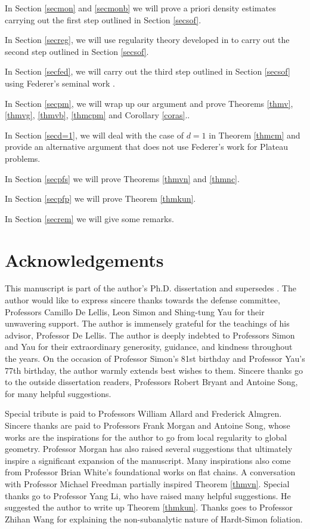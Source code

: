 \documentclass[11pt,a4paper]{amsart}
\numberwithin{equation}{section}
\theoremstyle{plain}
\theoremstyle{definition}
\numberwithin{equation}{subsection}
\begin{document}
In Section \ref{secmon} and \ref{secmonb} we will prove a priori density estimates carrying out the first step outlined in Section \ref{secsof}.

In Section \ref{secreg}, we will use regularity theory developed in \cite{DHMS} to carry out the second step outlined in Section \ref{secsof}.

In Section \ref{secfed}, we will carry out the third step outlined in Section \ref{secsof} using Federer's seminal work \cite{HFrf}.

In Section \ref{secpm}, we will wrap up our argument and prove  Theorems \ref{thmv}, \ref{thmvg}, \ref{thmvb}, \ref{thmcpm} and  Corollary \ref{coras}..

In Section \ref{secd=1}, we will deal with the case of $d=1$ in Theorem \ref{thmcm} and provide an alternative argument that does not use Federer's work \cite{HF} for Plateau problems.

In Section \ref{secpfs} we will prove Theorems \ref{thmvn} and \ref{thmnc}.


In Section \ref{secpfp} we will prove Theorem \ref{thmkun}.

In Section \ref{secrem} we will give some remarks.
	\section*{Acknowledgements}
This manuscript is part of the author's Ph.D. dissertation and  supersedes \cite{ZLar,ZLnco}. The author would like to express sincere thanks towards the defense committee, Professors Camillo De Lellis, Leon Simon and Shing-tung Yau for their unwavering support. The author is immensely grateful for the teachings of his advisor, Professor De Lellis. The author is deeply indebted to Professors Simon and Yau for their extraordinary generosity, guidance, and kindness throughout the years. On the occasion of Professor Simon's 81st birthday and Professor Yau's 77th birthday, the author warmly extends best wishes to them.  Sincere thanks go to the outside dissertation readers, Professors Robert Bryant and Antoine Song, for many helpful suggestions.

Special tribute is paid to Professors William Allard and Frederick Almgren. Sincere thanks are paid to Professors Frank Morgan and Antoine Song, whose works are the inspirations for the author to go from local regularity to global geometry. Professor Morgan has also raised several suggestions that ultimately inspire a significant expansion of the manuscript. Many inspirations also come from Professor Brian White's foundational works on flat chains. A conversation with Professor Michael Freedman partially inspired Theorem \ref{thmvn}. Special thanks go to Professor Yang Li, who have raised many helpful suggestions. He suggested the author to write up Theorem \ref{thmkun}. Thanks goes to Professor Zhihan Wang for explaining the non-subanalytic nature of Hardt-Simon foliation. 
\end{document}

